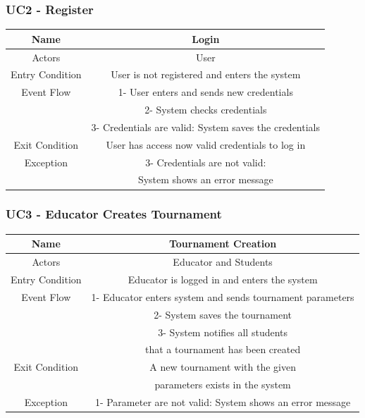\documentclass{article}
\begin{document}
\subsubsection*{UC2 - Register}

\begin{tabular*}{\linewidth}{@{\extracolsep{\fill}} cc }
    \hline
    Name & Login \\ 
    \hline
    Actors & User \\ 
    \hline
    Entry Condition & User is not registered and enters the system \\ 
    \hline
    Event Flow & 1- User enters and sends new credentials\\ 
               & 2- System checks credentials\\
               & 3- Credentials are valid: System saves the credentials\\ 
    \hline
    Exit Condition & User has access now valid credentials to log in\\ 
    \hline
    Exception & 3- Credentials are not valid:\\
              &   System shows an error message\\
    \hline
\end{tabular*}

\subsubsection*{UC3 - Educator Creates Tournament}

\begin{tabular*}{\linewidth}{@{\extracolsep{\fill}} cc }
    \hline
    Name & Tournament Creation \\ 
    \hline
    Actors & Educator and Students \\ 
    \hline
    Entry Condition & Educator is logged in and enters the system \\ 
    \hline
    Event Flow & 1- Educator enters system and sends tournament parameters\\
               & 2- System saves the tournament\\
               & 3- System notifies all students\\
               & that a tournament has been created\\
    \hline
    Exit Condition & A new tournament with the given\\
                   & parameters exists in the system\\
    \hline
    Exception & 1- Parameter are not valid: System shows an error message\\
    \hline
\end{tabular*}
\end{document}
